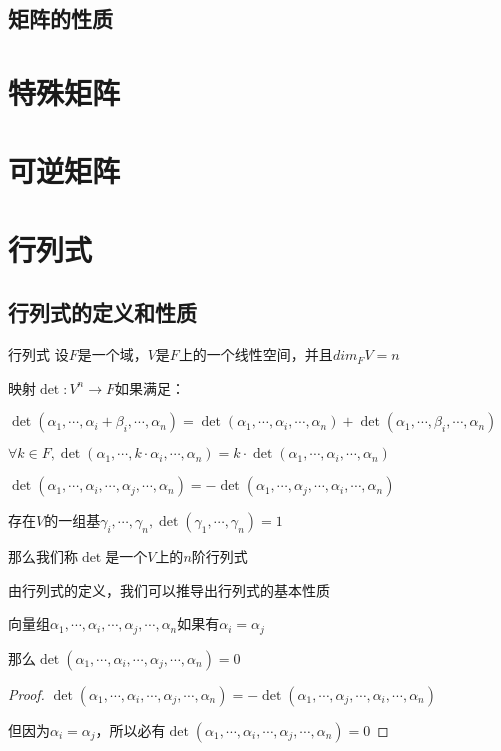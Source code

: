 \documentclass[12pt, a4paper, oneside, UTF8]{ctexbook}
\begin{document}
		\subsection{矩阵的性质}
	\section{特殊矩阵}
	\section{可逆矩阵}
	\section{行列式}
		\subsection{行列式的定义和性质}
			\begin{defn}{行列式}{}
				设$F$是一个域，$V$是$F$上的一个线性空间，并且$dim_F V = n$

				映射$\det: V^n \rightarrow F$如果满足：

				 $\det(\alpha_1,\cdots,\alpha_i + \beta_i,\cdots,\alpha_n)=\det(\alpha_1,\cdots,\alpha_i,\cdots,\alpha_n)+\det(\alpha_1,\cdots,\beta_i,\cdots,\alpha_n)$

				 $\forall k\in F,\det(\alpha_1,\cdots,k\cdot \alpha_i,\cdots,\alpha_n)=k \cdot \det(\alpha_1,\cdots,\alpha_i,\cdots,\alpha_n)$

				 $\det(\alpha_1,\cdots,\alpha_i,\cdots,\alpha_j,\cdots,\alpha_n)=-\det(\alpha_1,\cdots,\alpha_j,\cdots,\alpha_i,\cdots,\alpha_n)$

				 存在$V$的一组基$\gamma_i,\cdots,\gamma_n,\det(\gamma_1,\cdots,\gamma_n)=1$

				那么我们称$\det$是一个$V$上的$n$阶行列式
			\end{defn}
			由行列式的定义，我们可以推导出行列式的基本性质
			\begin{proposition}
				向量组$\alpha_1,\cdots,\alpha_i,\cdots,\alpha_j,\cdots,\alpha_n$如果有$\alpha_i=\alpha_j$

				那么$\det (\alpha_1,\cdots,\alpha_i,\cdots,\alpha_j,\cdots,\alpha_n)=0$
			\end{proposition}
			\begin{proof}
				$\det (\alpha_1,\cdots,\alpha_i,\cdots,\alpha_j,\cdots,\alpha_n)=-\det (\alpha_1,\cdots,\alpha_j,\cdots,\alpha_i,\cdots,\alpha_n)$

				但因为$\alpha_i=\alpha_j$，所以必有$\det (\alpha_1,\cdots,\alpha_i,\cdots,\alpha_j,\cdots,\alpha_n)=0$
			\end{proof}
\end{document}
